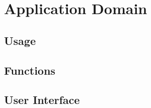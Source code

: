 \chapter{Application Domain}

\section{Usage}\label{usecase}


\section{Functions}


\section{User Interface}

